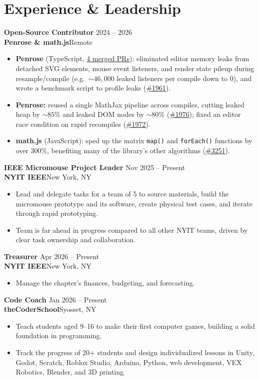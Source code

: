 \documentclass[10pt,letterpaper]{article}
\newcommand{\entry}[4]{%
  \textbf{#1} \hfill {\color{muted}#3}\\
  {\color{accent}\textbf{#2}}\hfill {\color{muted}\small #4}\par}
\begin{document}
\section{Experience \& Leadership}
\entry{Open-Source Contributor}{Penrose \& math.js}{2024 -- 2026}{Remote}
\begin{itemize}
  \item \textbf{Penrose} (TypeScript, \href{https://github.com/penrose/penrose/pulls?q=is\%3Apr+author\%3AGalm007+is\%3Amerged}{4 merged PRs}): eliminated editor memory leaks from detached SVG elements, mouse event listeners, and render state pileup during resample/compile (e.g.\ ${\sim}46{,}000$ leaked listeners per compile down to 0), and wrote a benchmark script to profile leaks (\href{https://github.com/penrose/penrose/pull/1961}{\#1961}).
  \item \textbf{Penrose:} reused a single MathJax pipeline across compiles, cutting leaked heap by ${\sim}85\%$ and leaked DOM nodes by ${\sim}80\%$ (\href{https://github.com/penrose/penrose/pull/1976}{\#1976}); fixed an editor race condition on rapid recompiles (\href{https://github.com/penrose/penrose/pull/1972}{\#1972}).
  \item \textbf{math.js} (JavaScript): sped up the matrix \texttt{map()} and \texttt{forEach()} functions by over 300\%, benefiting many of the library's other algorithms (\href{https://github.com/josdejong/mathjs/pull/3251}{\#3251}).
\end{itemize}
\vspace{3pt}
\entry{IEEE Micromouse Project Leader}{NYIT IEEE}{Nov 2025 -- Present}{New York, NY}
\begin{itemize}
  \item Lead and delegate tasks for a team of 5 to source materials, build the micromouse prototype and its software, create physical test cases, and iterate through rapid prototyping.
  \item Team is far ahead in progress compared to all other NYIT teams, driven by clear task ownership and collaboration.
\end{itemize}
\vspace{3pt}
\entry{Treasurer}{NYIT IEEE}{Apr 2026 -- Present}{New York, NY}
\begin{itemize}
  \item Manage the chapter's finances, budgeting, and forecasting.
\end{itemize}
\vspace{3pt}
\entry{Code Coach}{theCoderSchool}{Jan 2026 -- Present}{Syosset, NY}
\begin{itemize}
  \item Teach students aged 9--16 to make their first computer games, building a solid foundation in programming.
  \item Track the progress of 20+ students and design individualized lessons in Unity, Godot, Scratch, Roblox Studio, Arduino, Python, web development, VEX Robotics, Blender, and 3D printing.
\end{itemize}
\end{document}
